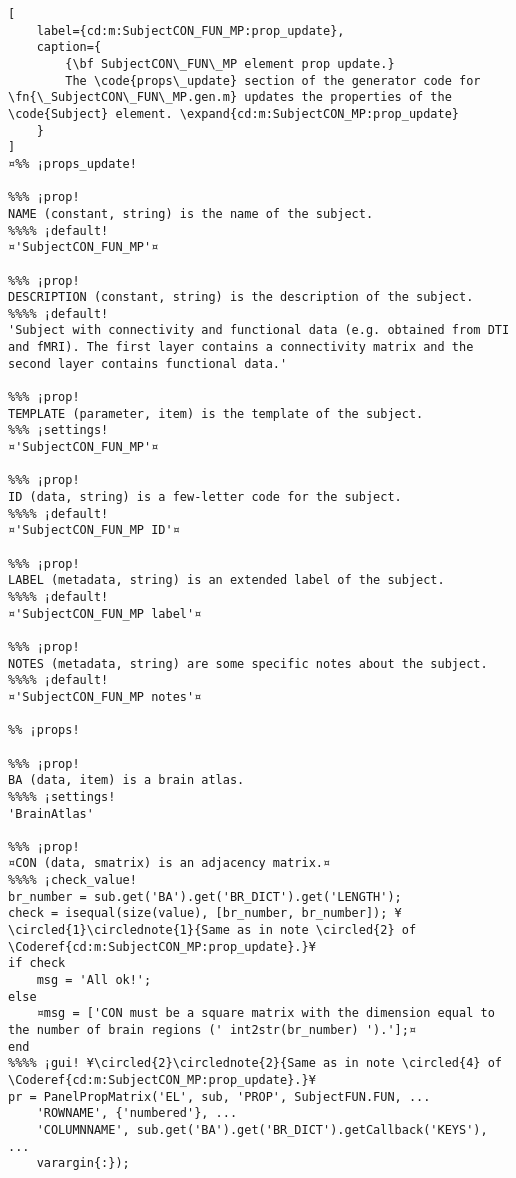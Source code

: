 \documentclass{tufte-handout}
\begin{document}
\begin{lstlisting}[
	label={cd:m:SubjectCON_FUN_MP:prop_update},
	caption={
		{\bf SubjectCON\_FUN\_MP element prop update.}
		The \code{props\_update} section of the generator code for \fn{\_SubjectCON\_FUN\_MP.gen.m} updates the properties of the \code{Subject} element. \expand{cd:m:SubjectCON_MP:prop_update}
	}
]
¤%% ¡props_update!

%%% ¡prop!
NAME (constant, string) is the name of the subject.
%%%% ¡default!
¤'SubjectCON_FUN_MP'¤

%%% ¡prop!
DESCRIPTION (constant, string) is the description of the subject.
%%%% ¡default!
'Subject with connectivity and functional data (e.g. obtained from DTI and fMRI). The first layer contains a connectivity matrix and the second layer contains functional data.'

%%% ¡prop!
TEMPLATE (parameter, item) is the template of the subject.
%%% ¡settings!
¤'SubjectCON_FUN_MP'¤

%%% ¡prop!
ID (data, string) is a few-letter code for the subject.
%%%% ¡default!
¤'SubjectCON_FUN_MP ID'¤

%%% ¡prop!
LABEL (metadata, string) is an extended label of the subject.
%%%% ¡default!
¤'SubjectCON_FUN_MP label'¤

%%% ¡prop!
NOTES (metadata, string) are some specific notes about the subject.
%%%% ¡default!
¤'SubjectCON_FUN_MP notes'¤

%% ¡props!

%%% ¡prop!
BA (data, item) is a brain atlas.
%%%% ¡settings!
'BrainAtlas'

%%% ¡prop!
¤CON (data, smatrix) is an adjacency matrix.¤
%%%% ¡check_value!
br_number = sub.get('BA').get('BR_DICT').get('LENGTH');
check = isequal(size(value), [br_number, br_number]); ¥\circled{1}\circlednote{1}{Same as in note \circled{2} of \Coderef{cd:m:SubjectCON_MP:prop_update}.}¥
if check
    msg = 'All ok!';
else   
    ¤msg = ['CON must be a square matrix with the dimension equal to the number of brain regions (' int2str(br_number) ').'];¤
end
%%%% ¡gui! ¥\circled{2}\circlednote{2}{Same as in note \circled{4} of \Coderef{cd:m:SubjectCON_MP:prop_update}.}¥
pr = PanelPropMatrix('EL', sub, 'PROP', SubjectFUN.FUN, ...
    'ROWNAME', {'numbered'}, ...
    'COLUMNNAME', sub.get('BA').get('BR_DICT').getCallback('KEYS'), ...
    varargin{:});

\end{lstlisting}
\clearpage
\end{document}
